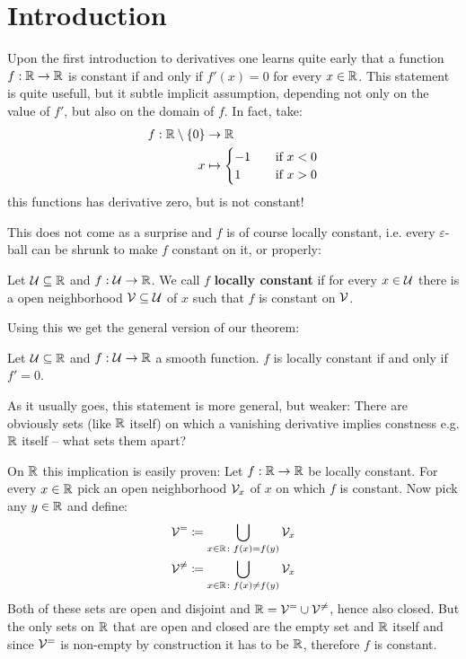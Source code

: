 \chapter*{Introduction}
Upon the first introduction to derivatives one learns quite early that a function
$f: \mathbb{R} \to \mathbb{R}$ is constant if and only if $f'(x) = 0$ for every $x \in \mathbb{R}$. This statement is quite usefull,
but it subtle implicit assumption, depending not only on the value of $f'$, but also on the domain
of $f$. In fact, take:
\begin{align*}
	f: \mathbb{R} \setminus \{0\} &\to \mathbb{R} \\
		x &\mapsto \begin{cases}
			-1 \quad&\text{if } x < 0 \\
			 1 \quad&\text{if } x > 0
		\end{cases}
\end{align*}
this functions has derivative zero, but is not constant!

This does not come as a surprise and $f$ is of course locally constant,
i.e. every $\varepsilon$-ball can be shrunk to make $f$ constant on it, or properly:
\begin{definition}
	Let $\mathcal{U} \subseteq \mathbb{R}$ and $f: \mathcal{U} \to \mathbb{R}$. We call $f$ \textbf{locally constant} if for every $x \in \mathcal{U}$
	there is a open neighborhood $\mathcal{V} \subseteq \mathcal{U}$ of $x$ such that $f$ is constant on $\mathcal{V}$.
\end{definition}

Using this we get the general version of our theorem:
\begin{lemma}
	Let $\mathcal{U} \subseteq \mathbb{R}$ and $f: \mathcal{U} \to \mathbb{R}$ a smooth function. $f$ is locally constant if and only if
	$f' = 0$.
\end{lemma}
As it usually goes, this statement is more general, but weaker: There are obviously sets (like $\mathbb{R}$ itself) on
which a vanishing derivative implies constness e.g. $\mathbb{R}$ itself – what sets them apart?

On $\mathbb{R}$ this implication is easily proven: Let $f: \mathbb{R} \to \mathbb{R}$ be locally constant. For every $x \in \mathbb{R}$
pick an open neighborhood $\mathcal{V}_x$ of $x$ on which $f$ is constant. Now pick any $y \in \mathbb{R}$ and
define:
\begin{align*}
	\mathcal{V}^=      &\coloneqq \bigcup_{x \in \mathbb{R}\colon f(x) = f(y)} \mathcal{V}_x \\
	\mathcal{V}^{\neq} &\coloneqq \bigcup_{x \in \mathbb{R}\colon f(x) \neq f(y)} \mathcal{V}_x
\end{align*}
Both of these sets are open and disjoint and $\mathbb{R} = \mathcal{V}^= \cup \mathcal{V}^{\neq}$, hence also closed.
But the only sets on $\mathbb{R}$ that are open and closed are the empty set and $\mathbb{R}$ itself and since
$\mathcal{V}^=$ is non-empty by construction it has to be $\mathbb{R}$, therefore $f$ is constant.


